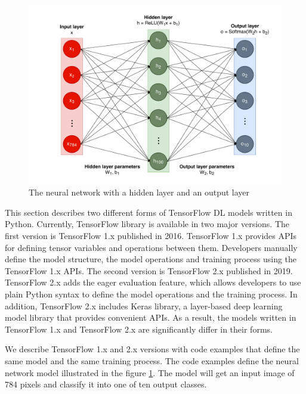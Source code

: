 \begin{figure}[ht!]
\includegraphics[width=\textwidth]{mnist_model.pdf}
  \caption{The neural network with a hidden layer and an output layer}
\label{fig:back:model}
\end{figure}

This section describes two different forms of TensorFlow DL models written in
Python.
Currently, TensorFlow library is available in two major versions.
The first version is TensorFlow 1.x published in 2016.
TensorFlow 1.x provides APIs for defining tensor variables and
operations between them.
Developers manually define the model structure, the model operations 
and training process using the TensorFlow 1.x APIs.
The second version is TensorFlow 2.x published in 2019.
TensorFlow 2.x adds the eager evaluation feature,
which allows developers to use plain Python syntax to define the model
operations and the training process.
In addition, TensorFlow 2.x includes Keras library, 
a layer-based deep learning model library that provides convenient APIs.
As a result, the models written in TensorFlow 1.x and TensorFlow 2.x are
significantly differ in their forms. 

We describe TensorFlow 1.x and 2.x versions with code examples that define
the same model and the same training process.
The code examples define the neural network model illustrated
in the figure \ref{fig:back:model}.
The model will get an input image of 784 pixels and classify it into one of ten
output classes.
 
